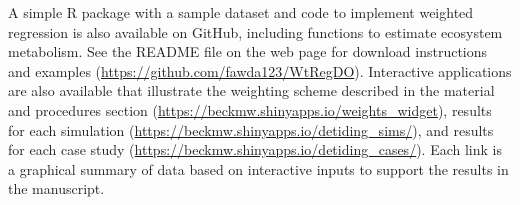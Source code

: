 A simple R package with a sample dataset and code to implement weighted regression is also available on GitHub, including functions to estimate ecosystem metabolism.  See the README file on the web page for download instructions and examples (\href{https://github.com/fawda123/WtRegDO}{https://github.com/fawda123/WtRegDO}).  Interactive applications are also available that illustrate the weighting scheme described in the material and procedures section (\href{https://beckmw.shinyapps.io/weights_widget}{https://beckmw.shinyapps.io/weights\_widget}), results for each simulation (\href{https://beckmw.shinyapps.io/detiding_sims/}{https://beckmw.shinyapps.io/detiding\_sims/}), and results for each case study (\href{https://beckmw.shinyapps.io/detiding_cases/}{https://beckmw.shinyapps.io/detiding\_cases/}).  Each link is a graphical summary of data based on interactive inputs to support the results in the manuscript.